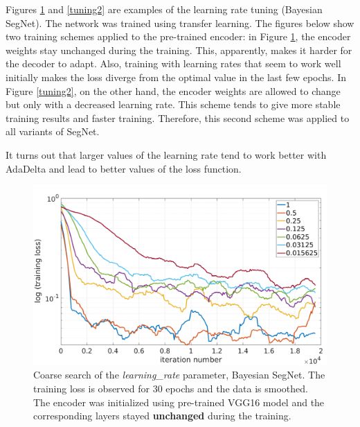 Figures \ref{tuning1} and \ref{tuning2} are examples of the learning rate tuning (Bayesian SegNet). The network was trained using transfer learning. The figures below show two training schemes applied to the pre-trained encoder: in Figure \ref{tuning1}, the encoder weights stay unchanged during the training. This, apparently, makes it harder for the decoder to adapt. Also, training with learning rates that seem to work well initially makes the loss diverge from the optimal value in the last few epochs. In Figure \ref{tuning2}, on the other hand, the encoder weights are allowed to change but only with a decreased learning rate. This scheme tends to give more stable training results and faster training. Therefore, this second scheme was applied to all variants of SegNet.  

It turns out that larger values of the learning rate tend to work better with AdaDelta and lead to better values of the loss function. 

\newpage

\begin{figure}[h]
	\begin{center}
		\includegraphics*[width=14cm, keepaspectratio]{obr/bayes_full_rough.png}
	\end{center}
	\vspace{5mm}
	\caption{Coarse search of the \textit{learning\_rate} parameter, Bayesian SegNet. The training loss is observed for 30 epochs and the data is smoothed. The encoder was initialized using pre-trained VGG16 model and the corresponding layers stayed \textbf{unchanged} during the training.} 
	\label{tuning1}
\end{figure}

